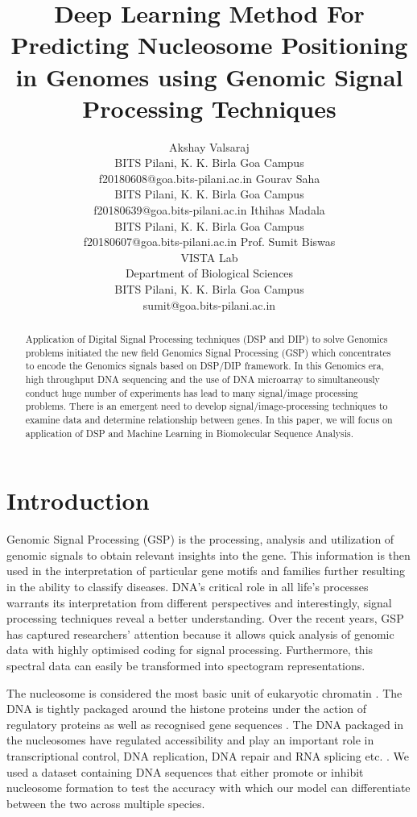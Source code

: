 \documentclass{article}
\title{
  Deep Learning Method For Predicting Nucleosome Positioning in Genomes using Genomic Signal Processing Techniques 
}
\author{%
  Akshay Valsaraj \\
  BITS Pilani, K. K. Birla Goa Campus \\
  f20180608@goa.bits-pilani.ac.in
  \And
  Gourav Saha \\
  BITS Pilani, K. K. Birla Goa Campus \\
  f20180639@goa.bits-pilani.ac.in
  \And
  Ithihas Madala \\
  BITS Pilani, K. K. Birla Goa Campus \\
  f20180607@goa.bits-pilani.ac.in
  \And
  Prof. Sumit Biswas \\
  VISTA Lab \\ 
  Department of Biological Sciences \\
  BITS Pilani, K. K. Birla Goa Campus \\
  sumit@goa.bits-pilani.ac.in
}
\begin{document}
\maketitle

\begin{abstract}
Application of Digital Signal Processing techniques (DSP and DIP) to solve Genomics
problems initiated the new field Genomics Signal Processing (GSP) which concentrates to 
encode the Genomics signals based on DSP/DIP framework. In this Genomics era, high 
throughput DNA sequencing and the use of DNA microarray to simultaneously conduct 
huge number of experiments has lead to many signal/image processing problems. 
There is an emergent need to develop signal/image-processing techniques to examine 
data and determine relationship between genes. In this paper, we will focus on 
application of DSP and Machine Learning in Biomolecular Sequence Analysis.

\end{abstract}

\section{Introduction}
Genomic Signal Processing (GSP) is the processing, analysis and utilization of genomic signals to obtain relevant insights into the gene. This information is then used in the interpretation of particular gene motifs and families further resulting in the ability to classify diseases. DNA's critical role in all life's processes warrants its interpretation from different perspectives and interestingly, signal processing techniques reveal a better understanding. Over the recent years, GSP has captured researchers' attention because it allows quick analysis of genomic data with highly optimised coding for signal processing. Furthermore, this spectral data can easily be transformed into spectogram representations.

The nucleosome is considered the most basic unit of eukaryotic chromatin \citep{Richmond1038nature01595-ni}. The DNA is tightly packaged around the histone proteins under the action of regulatory proteins as well as recognised gene sequences \citep{Satchwell1986-ku}. The DNA packaged in the nucleosomes have regulated accessibility and play an important role in transcriptional control, DNA replication, DNA repair and RNA splicing etc. \citep{Berbenetz2010-09-02-hm}. We used a dataset containing DNA sequences that either promote or inhibit nucleosome formation to test the accuracy with which our model can differentiate between the two across multiple species.
\end{document}
